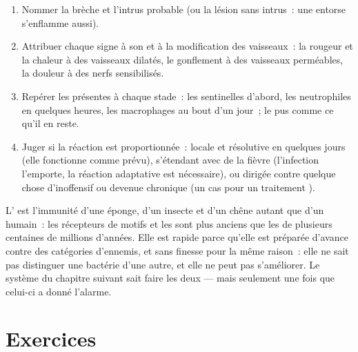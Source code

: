 \begin{method}\label{met:g12:innate-immunity:read}
\begin{enumerate}
  \item Nommer la brèche et l'intrus probable (ou la lésion sans
        intrus~: une entorse s'enflamme aussi).
  \item Attribuer chaque signe à son  et à la modification
        des vaisseaux~: la rougeur et la chaleur à des vaisseaux
        dilatés, le gonflement à des vaisseaux perméables, la douleur
        à des nerfs sensibilisés.
  \item Repérer les  présentes à chaque stade~: les
        sentinelles d'abord, les neutrophiles en quelques heures, les
        macrophages au bout d'un jour~; le pus comme ce qu'il en
        reste.
  \item Juger si la réaction est proportionnée~: locale et résolutive
        en quelques jours (elle fonctionne comme prévu), s'étendant
        avec de la fièvre (l'infection l'emporte, la réaction
        adaptative est nécessaire), ou dirigée contre quelque chose
        d'inoffensif ou devenue chronique (un cas pour un traitement
        ).
\end{enumerate}
\end{method}

\begin{remark}\label{rem:g12:innate-immunity:old}
L' est l'immunité d'une éponge, d'un insecte et d'un
chêne autant que d'un humain~: les récepteurs de motifs et les
 sont plus anciens que les  de plusieurs centaines
de millions d'années. Elle est rapide parce qu'elle est préparée
d'avance contre des catégories d'ennemis, et sans finesse pour la même
raison~: elle ne sait pas distinguer une bactérie d'une autre, et elle
ne peut pas s'améliorer. Le système du chapitre suivant sait faire les
deux --- mais seulement une fois que celui-ci a donné l'alarme.
\end{remark}

\section{Exercices}

